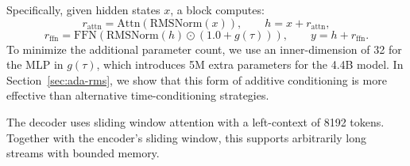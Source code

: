 Specifically, given hidden states $x$, a block computes:
\[
r_{\mathrm{attn}} = \mathrm{Attn}(\mathrm{RMSNorm}(x)), \qquad h = x + r_{\mathrm{attn}},
\]
\[
r_{\mathrm{ffn}} = \mathrm{FFN}\!\left(\mathrm{RMSNorm}(h) \odot \left(1.0 + g(\tau)\right)\right), \qquad y = h + r_{\mathrm{ffn}}.
\]
To minimize the additional parameter count, we use an inner-dimension of 32 for the MLP in $g(\tau)$, which introduces 5M extra parameters for the 4.4B model. In Section~\ref{sec:ada-rms}, we show that this form of additive conditioning is more effective than alternative time-conditioning strategies.%

The decoder uses sliding window attention with a left-context of 8192 tokens. Together with the encoder’s sliding window, this supports arbitrarily long streams with bounded memory.